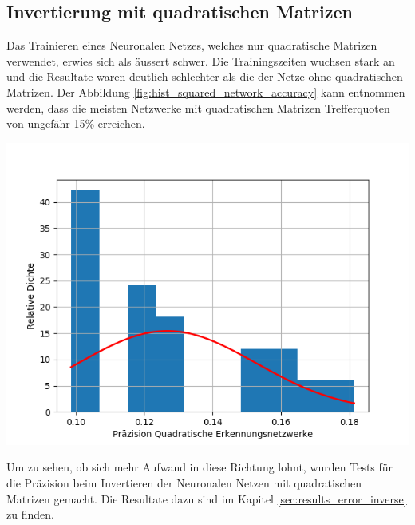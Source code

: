 \documentclass[Interploate_hadwritten_Digits.tex]{subfiles}
\begin{document}
	\subsection{Invertierung mit quadratischen Matrizen}
	Das Trainieren eines Neuronalen Netzes, welches nur quadratische Matrizen verwendet, erwies sich als äussert schwer. Die Trainingszeiten wuchsen stark an und die Resultate waren deutlich schlechter als die der Netze ohne quadratischen Matrizen. Der Abbildung \ref{fig:hist_squared_network_accuracy} kann entnommen werden, dass die meisten Netzwerke mit quadratischen Matrizen Trefferquoten von ungefähr 15\% erreichen.
	\begin{Figure}
		\centering
		\includegraphics[width=\linewidth]{img/results/histogram_squared_network_accuracy.png}
		\label{fig:hist_squared_network_accuracy}
	\end{Figure}

	Um zu sehen, ob sich mehr Aufwand in diese Richtung lohnt, wurden Tests für die Präzision beim Invertieren der Neuronalen Netzen mit quadratischen Matrizen gemacht. Die Resultate dazu sind im Kapitel \ref{sec:results_error_inverse} zu finden.
\end{document}
